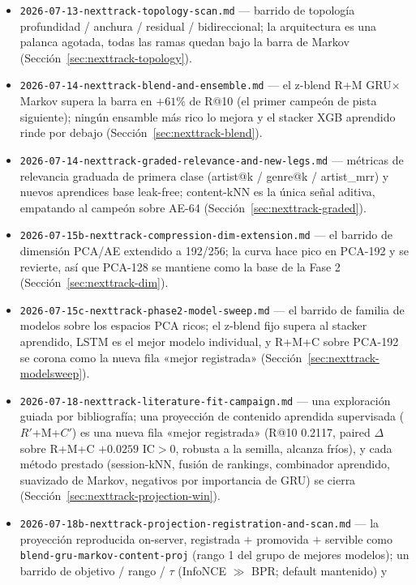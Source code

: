 \documentclass[11pt]{article}
\newcommand{\Rp}{\ensuremath{R'}}
\newcommand{\Cp}{\ensuremath{C'}}
\begin{document}
\begin{itemize}
  \item \texttt{2026-07-13-nexttrack-topology-scan.md} --- barrido de topología
    profundidad / anchura / residual / bidireccional; la arquitectura es una palanca
    agotada, todas las ramas quedan bajo la barra de Markov
    (Sección~\ref{sec:nexttrack-topology}).
  \item \texttt{2026-07-14-nexttrack-blend-and-ensemble.md} --- el z-blend R+M
    GRU$\times$Markov supera la barra en $+61\%$ de R@10 (el primer campeón de pista
    siguiente); ningún ensamble más rico lo mejora y el stacker XGB aprendido rinde
    por debajo (Sección~\ref{sec:nexttrack-blend}).
  \item \texttt{2026-07-14-nexttrack-graded-relevance-and-new-legs.md} --- métricas
    de relevancia graduada de primera clase (artist@k / genre@k / artist\_mrr) y
    nuevos aprendices base leak-free; content-kNN es la única señal aditiva,
    empatando al campeón sobre AE-64 (Sección~\ref{sec:nexttrack-graded}).
  \item \texttt{2026-07-15b-nexttrack-compression-dim-extension.md} --- el barrido de
    dimensión PCA/AE extendido a 192/256; la curva hace pico en PCA-192 y se
    revierte, así que PCA-128 se mantiene como la base de la Fase 2
    (Sección~\ref{sec:nexttrack-dim}).
  \item \texttt{2026-07-15c-nexttrack-phase2-model-sweep.md} --- el barrido de
    familia de modelos sobre los espacios PCA ricos; el z-blend fijo supera al
    stacker aprendido, LSTM es el mejor modelo individual, y R+M+C sobre PCA-192 se
    corona como la nueva fila «mejor registrada» (Sección~\ref{sec:nexttrack-modelsweep}).
  \item \texttt{2026-07-18-nexttrack-literature-fit-campaign.md} --- una exploración
    guiada por bibliografía; una proyección de contenido aprendida supervisada
    (\Rp+M+\Cp) es una nueva fila «mejor registrada» (R@10 \num{0.2117}, paired $\Delta$
    sobre R+M+C $+\num{0.0259}$ IC$>$0, robusta a la semilla, alcanza fríos), y cada método
    prestado (session-kNN, fusión de rankings, combinador aprendido, suavizado de Markov,
    negativos por importancia de GRU) se cierra (Sección~\ref{sec:nexttrack-projection-win}).
  \item \texttt{2026-07-18b-nexttrack-projection-registration-and-scan.md} --- la
    proyección reproducida on-server, registrada $+$ promovida $+$ servible como
    \texttt{blend-gru-markov-content-proj} (rango 1 del grupo de mejores modelos); un
    barrido de objetivo / rango / $\tau$ (InfoNCE $\gg$ BPR; default mantenido) y

\end{itemize}
\end{document}
